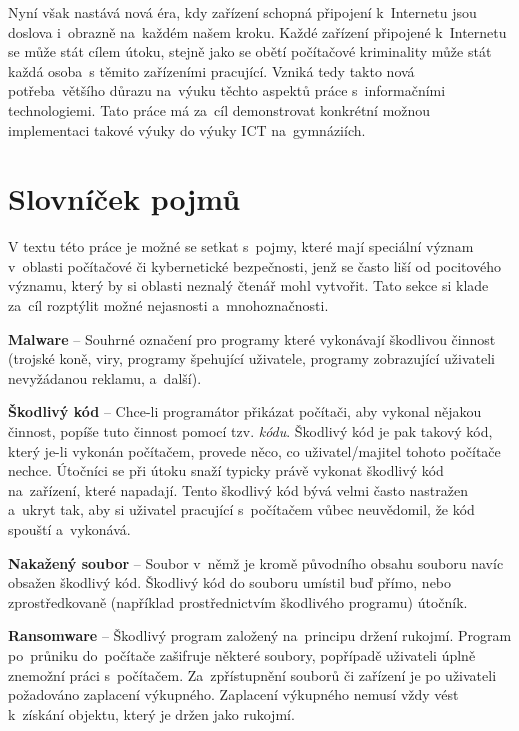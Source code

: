 \documentclass[a4paper, 12pt]{article}
\begin{document}
Nyní však nastává nová éra, kdy zařízení schopná připojení k~Internetu jsou doslova i~obrazně na~každém našem kroku. Každé zařízení připojené k~Internetu se může stát cílem útoku, stejně jako se obětí počítačové kriminality může stát každá osoba~s těmito zařízeními pracující. Vzniká tedy takto nová potřeba~většího důrazu na~výuku těchto aspektů práce s~informačními technologiemi. Tato práce má za~cíl demonstrovat konkrétní možnou implementaci takové výuky do výuky ICT na~gymnáziích.

\newpage
\section{Slovníček pojmů}
V textu této práce je možné se setkat s~pojmy, které mají speciální význam v~oblasti počítačové či kybernetické bezpečnosti, jenž se často liší od pocitového významu, který by si oblasti neznalý čtenář mohl vytvořit. Tato sekce si klade za~cíl rozptýlit možné nejasnosti a~mnohoznačnosti.

\textbf{Malware} -- Souhrné označení pro programy které vykonávají škodlivou činnost (trojské koně, viry, programy špehující uživatele, programy zobrazující uživateli nevyžádanou reklamu, a~další).

\textbf{Škodlivý kód} -- Chce-li programátor přikázat počítači, aby vykonal nějakou činnost, popíše tuto činnost pomocí tzv. \textit{kódu}. Škodlivý kód je pak takový kód, který je-li vykonán počítačem, provede něco, co uživatel/majitel tohoto počítače nechce. Útočníci se při útoku snaží typicky právě vykonat škodlivý kód na~zařízení, které napadají. Tento škodlivý kód bývá velmi často nastražen a~ukryt tak, aby si uživatel pracující s~počítačem vůbec neuvědomil, že kód spouští a~vykonává.

\textbf{Nakažený soubor} -- Soubor v~němž je kromě původního obsahu souboru navíc obsažen škodlivý kód. Škodlivý kód do souboru umístil buď přímo, nebo zprostředkovaně (například prostřednictvím škodlivého programu) útočník.

\textbf{Ransomware} -- Škodlivý program založený na~principu držení rukojmí. Program po~průniku do~počítače zašifruje některé soubory, popřípadě uživateli úplně znemožní práci s~počítačem. Za~zpřístupnění souborů či zařízení je po uživateli požadováno zaplacení výkupného. Zaplacení výkupného nemusí vždy vést k~získání objektu, který je držen jako rukojmí.
\end{document}
